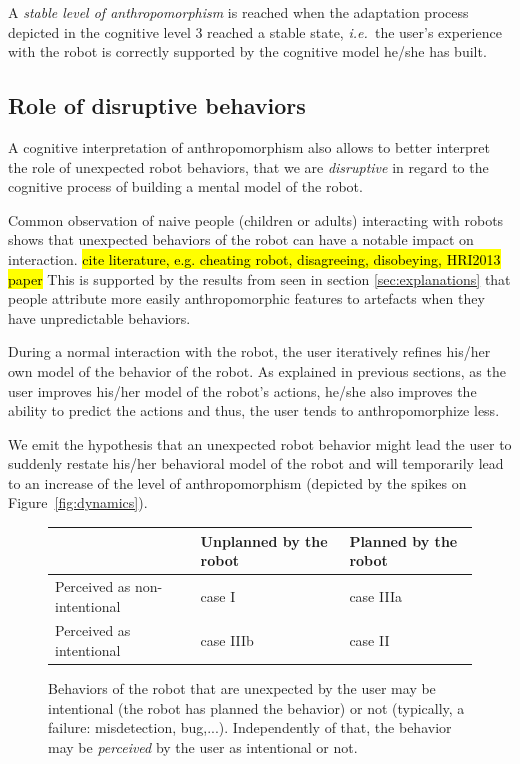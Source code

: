 \documentclass{frontiersSCNS} %
\newcommand{\ie}{{\textit{i.e.~}}}
\begin{document}
A \emph{stable level of anthropomorphism} is reached when the adaptation process
depicted in the cognitive level 3 reached a stable state, \ie the user's
experience with the robot is correctly supported by the cognitive model he/she
has built.

\subsection{Role of disruptive behaviors}
\label{sec:disruptive}

A cognitive interpretation of anthropomorphism also allows to better interpret
the role of unexpected robot behaviors, that we are \emph{disruptive} in regard
to the cognitive process of building a mental model of the robot.

Common observation of naive people (children or adults) interacting with robots
shows that unexpected behaviors of the robot can have a notable impact on
interaction. \hl{cite literature, e.g. cheating robot, disagreeing, disobeying,
HRI2013 paper}
This is supported by the results from \citet{Waitz2010} seen in section
\ref{sec:explanations} that people attribute more easily anthropomorphic
features to artefacts when they have unpredictable behaviors.

During a normal interaction with the robot, the user iteratively refines his/her
own model of the behavior of the robot. As explained in previous sections, as
the user improves his/her model of the robot's actions, he/she also improves the
ability to predict the actions and thus, the user tends to anthropomorphize
less.

We emit the hypothesis that an unexpected robot behavior might lead the user to
suddenly restate his/her behavioral model of the robot and will temporarily lead
to an increase of the level of anthropomorphism (depicted by the spikes on
Figure~\ref{fig:dynamics}).



\begin{figure}\footnotesize
    \centering
    \begin{tabular}{  >{\centering\arraybackslash}m{2cm} | >{\centering\arraybackslash}m{2cm} | >{\centering\arraybackslash}m{2cm} }
     & Unplanned by the robot & Planned by the robot \\ \hline
    Perceived as non-intentional & case I  & case IIIa  \\ \hline
    Perceived as intentional &  case IIIb & case II 
    \end{tabular}
\caption{
    Behaviors of the robot that are unexpected by the user may be intentional
    (the robot has planned the behavior) or not (typically, a failure:
    misdetection, bug,...). Independently of that, the behavior may be
    \emph{perceived} by the user as intentional or not.}
\label{fig:perceptionUnexpectedBehavior}
\end{figure}
\end{document}
